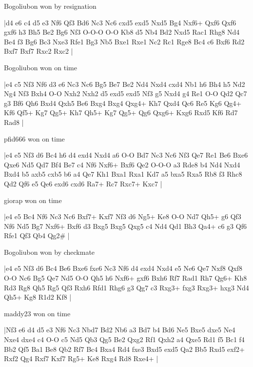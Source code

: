 \showboard

Bogoliubon won by resignation

\makegametitle
|d4 e6 c4 d5 e3 Nf6 Qf3 Bd6 Nc3 Nc6 cxd5 exd5 Nxd5 Bg4 Nxf6+ Qxf6 Qxf6 gxf6 h3 Bh5 Be2 Bg6 Nf3 O-O-O O-O Kb8 d5 Nb4 Bd2 Nxd5 Rac1 Rhg8 Nd4 Be4 f3 Bg6 Bc3 Nxe3 Rfe1 Bg3 Nb5 Bxe1 Rxe1 Nc2 Rc1 Rge8 Bc4 c6 Bxf6 Rd2 Bxf7 Bxf7 Rxc2 Rxc2  |

\showboard

Bogoliubon won on time

\makegametitle
|e4 c5 Nf3 Nf6 d3 e6 Nc3 Nc6 Bg5 Be7 Be2 Nd4 Nxd4 cxd4 Nb1 h6 Bh4 h5 Nd2 Ng4 Nf3 Bxh4 O-O Nxh2 Nxh2 d5 exd5 exd5 Nf3 g5 Nxd4 g4 Re1 O-O Qd2 Qc7 g3 Bf6 Qh6 Bxd4 Qxh5 Be6 Bxg4 Bxg4 Qxg4+ Kh7 Qxd4 Qc6 Re5 Kg6 Qg4+ Kf6 Qf5+ Kg7 Qg5+ Kh7 Qh5+ Kg7 Qg5+ Qg6 Qxg6+ Kxg6 Rxd5 Kf6 Rd7 Rad8  |

\showboard

pfid666 won on time

\makegametitle
|e4 e5 Nf3 d6 Bc4 h6 d4 exd4 Nxd4 a6 O-O Bd7 Nc3 Nc6 Nf3 Qe7 Re1 Be6 Bxe6 Qxe6 Nd5 Qd7 Bf4 Be7 c4 Nf6 Nxf6+ Bxf6 Qe2 O-O-O a3 Rde8 b4 Nd4 Nxd4 Bxd4 b5 axb5 cxb5 b6 a4 Qe7 Kh1 Bxa1 Rxa1 Kd7 a5 bxa5 Rxa5 Rb8 f3 Rhc8 Qd2 Qf6 e5 Qe6 exd6 cxd6 Ra7+ Rc7 Rxc7+ Kxc7  |

\showboard

giorap won on time

\makegametitle
|e4 e5 Bc4 Nf6 Nc3 Nc6 Bxf7+ Kxf7 Nf3 d6 Ng5+ Ke8 O-O Nd7 Qh5+ g6 Qf3 Nf6 Nd5 Bg7 Nxf6+ Bxf6 d3 Bxg5 Bxg5 Qxg5 c4 Nd4 Qd1 Bh3 Qa4+ c6 g3 Qf6 Rfe1 Qf3 Qb4 Qg2\#  |

\showboard

Bogoliubon won by checkmate

\makegametitle
|e4 e5 Nf3 d6 Bc4 Be6 Bxe6 fxe6 Nc3 Nf6 d4 exd4 Nxd4 e5 Ne6 Qe7 Nxf8 Qxf8 O-O Nc6 Bg5 Qe7 Nd5 O-O Qh5 h6 Nxf6+ gxf6 Bxh6 Rf7 Rad1 Rh7 Qg6+ Kh8 Rd3 Rg8 Qh5 Rg5 Qf3 Rxh6 Rfd1 Rhg6 g3 Qg7 c3 Rxg3+ fxg3 Rxg3+ hxg3 Nd4 Qh5+ Kg8 R1d2 Kf8  |

\showboard

maddy23 won on time

\makegametitle
|Nf3 e6 d4 d5 e3 Nf6 Nc3 Nbd7 Bd2 Nb6 a3 Bd7 b4 Bd6 Ne5 Bxe5 dxe5 Ne4 Nxe4 dxe4 c4 O-O c5 Nd5 Qb3 Qg5 Be2 Qxg2 Rf1 Qxh2 a4 Qxe5 Rd1 f5 Bc1 f4 Bb2 Qf5 Ba1 Be8 Qb2 Rf7 Bc4 Bxa4 Rd4 fxe3 Bxd5 exd5 Qa2 Bb5 Rxd5 exf2+ Rxf2 Qg4 Rxf7 Kxf7 Rg5+ Ke8 Rxg4 Rd8 Rxe4+  |

